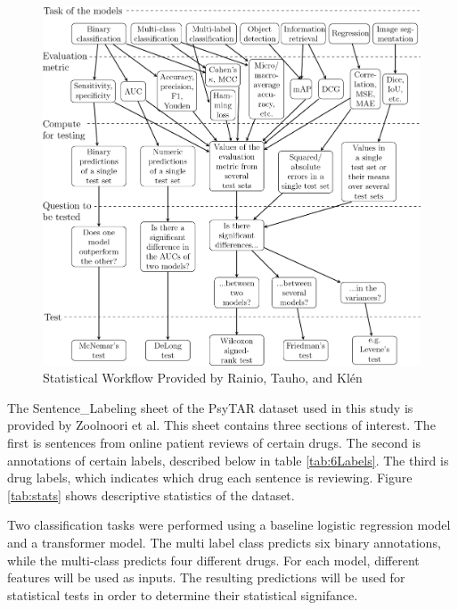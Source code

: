 \documentclass[10.7pt, onecolumn]{article}
\begin{document}
\begin{figure}[H]
  \centering
  \includegraphics[width=\textwidth]{images/41598_2024_56706_Fig3_HTML.png}
  \caption{Statistical Workflow Provided by Rainio, Tauho, and Klén\cite{statsBased}}
  \label{fig:statistical test workflow}
\end{figure}
 
The Sentence\_Labeling sheet of the PsyTAR dataset used in this study is provided by Zoolnoori et al\cite{psyTAR1}\cite{psyTar2}. This sheet contains three sections of interest. The first is sentences from online patient reviews of certain drugs. The second is annotations of certain labels, described below in table \ref{tab:6Labels}. The third is drug labels, which indicates which drug each sentence is reviewing. Figure \ref{tab:stats} shows descriptive statistics of the dataset.

Two classification tasks were performed using a baseline logistic regression model and a transformer model. The multi label class predicts six binary annotations, while the multi-class predicts four different drugs. For each model, different features will be used as inputs. The resulting predictions will be used for statistical tests in order to determine their statistical signifance. 
\end{document}
